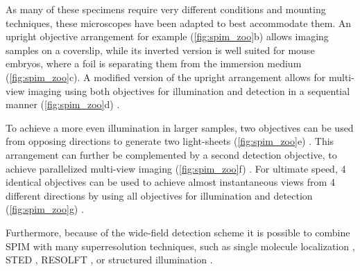   As many of these specimens require very different conditions and mounting techniques, these microscopes have been adapted to best accommodate them. An upright objective arrangement for example (\autoref{fig:spim_zoo}b) allows imaging samples on a coverslip, while its inverted version is well suited for mouse embryos, where a foil is separating them from the immersion medium (\autoref{fig:spim_zoo}c). A modified version of the upright arrangement allows for multi-view imaging using both objectives for illumination and detection in a sequential manner (\autoref{fig:spim_zoo}d) \cite{kumar_dual-view_2014}.

  To achieve a more even illumination in larger samples, two objectives can be used from opposing directions to generate two light-sheets (\autoref{fig:spim_zoo}e) \cite{huisken_even_2007}. This arrangement can further be complemented by a second detection objective, to achieve parallelized multi-view imaging (\autoref{fig:spim_zoo}f) \cite{krzic_multiview_2012,tomer_quantitative_2012, schmid_high-speed_2013}. For ultimate speed, 4 identical objectives can be used to achieve almost instantaneous views from 4 different directions by using all objectives for illumination and detection (\autoref{fig:spim_zoo}g) \cite{chhetri_whole-animal_2015}. 

  Furthermore, because of the wide-field detection scheme it is possible to combine SPIM with many superresolution techniques, such as single molecule localization \cite{cella_zanacchi_live-cell_2011}, STED \cite{friedrich_sted-spim:_2011}, RESOLFT \cite{hoyer_breaking_2016}, or structured illumination \cite{keller_fast_2010,chen_lattice_2014,chang_csilsfm_2017}.






